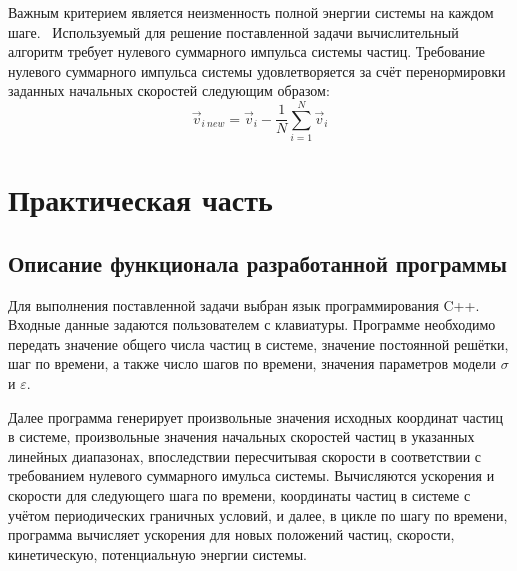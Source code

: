 \documentclass[14pt,a4paper,report]{ncc}
\begin{document}
Важным критерием является неизменность полной энергии системы на каждом шаге.
\ 
Используемый для решение поставленной задачи вычислительный алгоритм требует нулевого суммарного импульса системы частиц.
Требование нулевого суммарного импульса системы удовлетворяется за счёт перенормировки заданных начальных скоростей следующим образом:
\begin{equation}
\vec{v}_{{i} \ new} = \vec{v}_i - {\frac{1}{N}}\sum\limits_{i=1}^N \vec{v}_i
\end{equation}
\newpage\section{Практическая часть}
\subsection{Описание функционала разработанной программы}
Для выполнения поставленной задачи выбран язык программирования C++. Входные данные задаются пользователем с клавиатуры. Программе необходимо передать значение общего числа частиц в системе, значение постоянной решётки, шаг по времени, а также число шагов по времени, значения параметров модели $\sigma$ и $\varepsilon$.
\

Далее программа генерирует произвольные значения исходных координат частиц в системе, произвольные значения начальных скоростей частиц в указанных линейных диапазонах, впоследствии пересчитывая скорости в соответствии с требованием нулевого суммарного имульса системы. Вычисляются ускорения и скорости для следующего шага по времени, координаты частиц в системе с учётом периодических граничных условий, и далее, в цикле по шагу по времени, программа вычисляет ускорения для новых положений частиц, скорости, кинетическую, потенциальную энергии системы.
\
\end{document}
